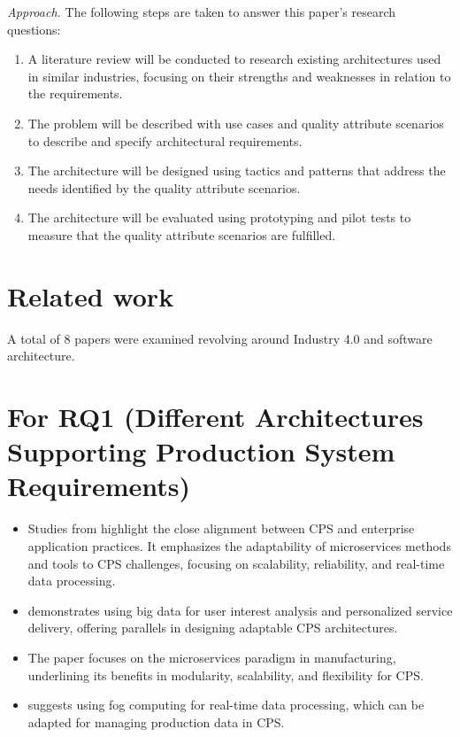\documentclass[conference]{IEEEtran}
\begin{document}
\emph{Approach.}
The following steps are taken to answer this paper's research questions: 
\begin{enumerate}
    \item A literature review will be conducted to research existing architectures used in similar industries, focusing on their strengths and weaknesses in relation to the requirements.
    \item The problem will be described with use cases and quality attribute scenarios to describe and specify architectural requirements.
    \item The architecture will be designed using tactics and patterns that address the needs identified by the quality attribute scenarios.
    \item The architecture will be evaluated using prototyping and pilot tests to measure that the quality attribute scenarios are fulfilled.
\end{enumerate}



\section{Related work}
\label{sec:related_work}
A total of 8 papers were examined revolving around Industry 4.0 and software architecture.

\section*{For RQ1 (Different Architectures Supporting Production System Requirements)}

\begin{itemize}
    \item Studies from \cite{AdoptingMicroservicesDevOps} highlight the close alignment between CPS and enterprise application practices. It emphasizes the adaptability of microservices methods and tools to CPS challenges, focusing on scalability, reliability, and real-time data processing.
    \item \cite{ABigDataPlatform} demonstrates using big data for user interest analysis and personalized service delivery, offering parallels in designing adaptable CPS architectures.
    \item The paper \cite{UseOfLightweightVirtualization} focuses on the microservices paradigm in manufacturing, underlining its benefits in modularity, scalability, and flexibility for CPS.
    \item \cite{IoT-fog-based-healthcare} suggests using fog computing for real-time data processing, which can be adapted for managing production data in CPS.
\end{itemize}
\end{document}
